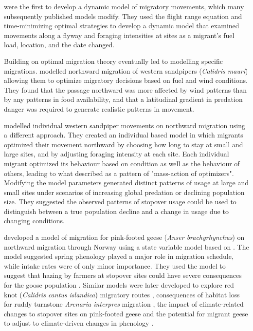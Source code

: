  \citet{Weber1998} were the first to develop a dynamic model of migratory movements, which many subsequently published models modify. They used the flight range equation and time-minimizing optimal strategies to develop a dynamic model that examined movements along a flyway and foraging intensities at sites as a migrant's fuel load, location, and the date changed. 

Building on optimal migration theory eventually led to modelling specific migrations. \citet{clark_fitness_1999} modelled northward migration of western sandpipers (\textit{Calidris mauri}) allowing them to optimize migratory decisions based on fuel and wind conditions. They found that the passage northward was more affected by wind patterns than by any patterns in food availability, and that a latitudinal gradient in predation danger was required to generate realistic patterns in movement.

\citet{Taylor2007} modelled individual western sandpiper movements on northward migration using a different approach. They created an individual based model in which migrants optimized their movement northward by choosing how long to stay at small and large sites, and by adjusting foraging intensity at each site. Each individual migrant optimized its behaviour based on condition as well as the behaviour of others, leading to what \citet{Taylor2007} described as a pattern of "mass-action of optimizers". Modifying the model parameters generated distinct patterns of usage at large and small sites under scenarios of increasing global predation or declining population size. They suggested the observed patterns of stopover usage could be used to distinguish between a true population decline and a change in usage due to changing conditions.

\begin{sloppypar}
\citet{bauer2006intake} developed a model of migration for pink-footed geese (\textit{Anser brachyrhynchus}) on northward migration through Norway using a state variable model based on \citet{Weber1998}. The model suggested spring phenology played a major role in migration schedule, while intake rates were of only minor importance. They used the model to suggest that hazing by farmers at stopover sites could have severe consequences for the goose population \citep{JPE:JPE1109}. Similar models were later developed to explore red knot (\textit{Calidris cantus islandica}) migratory routes \citep{Bauer2010}, consequences of habitat loss for ruddy turnstone \textit{Arenaria interpres} migration \citep{Aharon-Rotman2016}, the impact of climate-related changes to stopover sites on pink-footed geese \citep{JANE:JANE1381} and the potential for migrant geese to adjust to climate-driven changes in phenology \citep{Lameris2017}.
\end{sloppypar}

